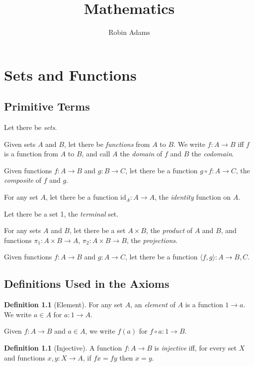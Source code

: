 \documentclass{book}
\title{Mathematics}
\author{Robin Adams}
\theoremstyle{definition}
\newtheorem{df}[ax]{Definition}
\newcommand{\id}[1]{\ensuremath{\mathrm{id}_{#1}}}
\begin{document}
\maketitle
\tableofcontents

\chapter{Sets and Functions}

\section{Primitive Terms}

Let there be \emph{sets}.

Given sets $A$ and $B$, let there be \emph{functions} from $A$ to $B$. We write $f : A \rightarrow B$ iff $f$ is a function from $A$ to $B$, and call $A$ the \emph{domain} of $f$ and $B$ the \emph{codomain}.

Given functions $f : A \rightarrow B$ and $g : B \rightarrow C$, let there be a function $g \circ f : A \rightarrow C$, the \emph{composite} of $f$ and $g$.

For any set $A$, let there be a function $\id{A} : A \rightarrow A$, the \emph{identity} function on $A$.

Let there be a set 1, the \emph{terminal} set.

For any sets $A$ and $B$, let there be a set $A \times B$, the \emph{product} of $A$ and $B$, and functions $\pi_1 : A \times B \rightarrow A$, $\pi_2 : A \times B \rightarrow B$, the \emph{projections}.

Given functions $f : A \rightarrow B$ and $g : A \rightarrow C$, let there be a function $\langle f,g \rangle : A \rightarrow B, C$.

\section{Definitions Used in the Axioms}

\begin{df}[Element]
For any set $A$, an \emph{element} of $A$ is a function $1 \rightarrow a$. We write $a \in A$ for $a : 1 \rightarrow A$.

Given $f : A \rightarrow B$ and $a \in A$, we write $f(a)$ for $f \circ a : 1 \rightarrow B$.
\end{df}

\begin{df}[Injective]
A function $f : A \rightarrow B$ is \emph{injective} iff, for every set $X$ and functions $x,y : X \rightarrow A$, if $fx = fy$ then $x = y$.
\end{df}
\end{document}
